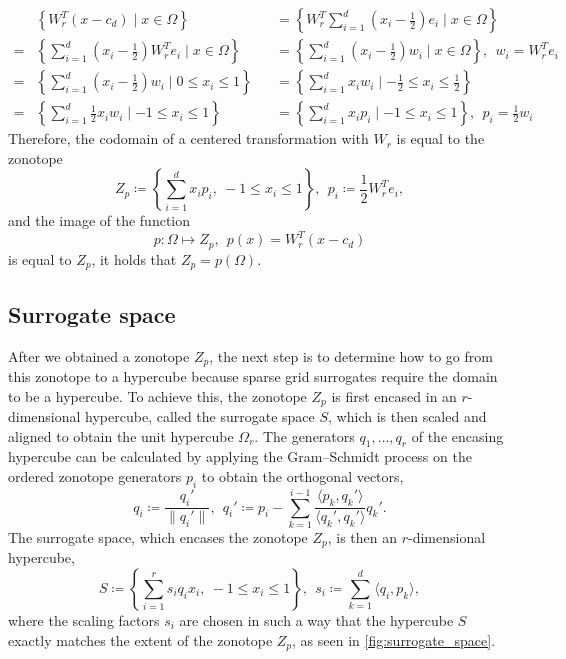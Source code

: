 \documentclass[
  a4paper,  %
  twoside,  %
  bibliography=totoc,
  headsepline,
  cleardoublepage=empty,
  parskip=half,
  draft=false
]{scrbook}
\begin{document}
\begin{equation}
\begin{alignedat}{2}
&\left\{W_r^T (x - c_d) \mid x \in \Omega\right\}&&=\left\{W_r^T \sum_{i=1}^d \left(x_i - \frac{1}{2}\right) e_i \mid x \in \Omega \right\}\\
=&\left\{\sum_{i=1}^d \left(x_i - \frac{1}{2}\right) W_r^T e_i \mid x \in \Omega \right\}&&=\left\{\sum_{i=1}^d \left(x_i - \frac{1}{2}\right) w_i \mid x \in \Omega \right\}, ~~ w_i=W_r^T e_i\\
=&\left\{\sum_{i=1}^d \left(x_i - \frac{1}{2}\right) w_i \mid 0 \leq x_i \leq 1 \right\}&&=\left\{\sum_{i=1}^d x_i w_i \mid -\frac{1}{2} \leq x_i \leq \frac{1}{2} \right\}\\
=&\left\{\sum_{i=1}^d \frac{1}{2} x_i w_i \mid -1 \leq x_i \leq 1 \right\}&&=\left\{\sum_{i=1}^d x_i p_i \mid -1 \leq x_i \leq 1 \right\}, ~~ p_i=\frac{1}{2} w_i
\label{zonotope_form}
\end{alignedat}
\end{equation}
%
Therefore, the codomain of a centered transformation with $W_r$ is equal to the zonotope
\begin{equation}
Z_{p} \coloneqq \left\{\sum_{i=1}^d x_i p_i , ~ -1 \leq x_i \leq 1\right\}, ~~ p_i \coloneqq \frac{1}{2} W_r^T e_i,
\end{equation}
and the image of the function
\begin{equation}
p \colon \Omega \mapsto Z_p, ~~ p(x)=W_r^T (x-c_d)
\end{equation}
is equal to $Z_p$, \ie it holds that $Z_{p}=p(\Omega)$.

\subsection{Surrogate space}

After we obtained a zonotope $Z_p$, the next step is to determine how to go from this zonotope to a hypercube because sparse grid surrogates require the domain to be a hypercube.
To achieve this, the zonotope $Z_p$ is first encased in an $r$-dimensional hypercube, called the surrogate space $S$, which is then scaled and aligned to obtain the unit hypercube $\Omega_r$.
The generators $q_1, \dots, q_r$ of the encasing hypercube can be calculated by applying the Gram–Schmidt process on the ordered zonotope generators $p_i$ to obtain the orthogonal vectors,
\begin{equation}
q_i \coloneqq \frac{q_i'}{\| q_i' \|},~~ q_i' \coloneqq p_i - \sum_{k=1}^{i-1} \frac{\langle p_k, q_k'\rangle}{\langle q_k', q_k' \rangle} q_k'.
\label{q}
\end{equation}
%
The surrogate space, which encases the zonotope $Z_p$, is then an $r$-dimensional hypercube,
\begin{equation}
S \coloneqq \left\{\sum_{i=1}^r s_i q_i x_i, ~ -1 \leq x_i \leq 1\right\},~~ s_i \coloneqq \sum_{k=1}^d \langle q_i, p_k\rangle,
\label{surrogate_space}
\end{equation}
where the scaling factors $s_i$ are chosen in such a way that the hypercube $S$ exactly matches the extent of the zonotope $Z_p$, as seen in \cref{fig:surrogate_space}.
\end{document}
